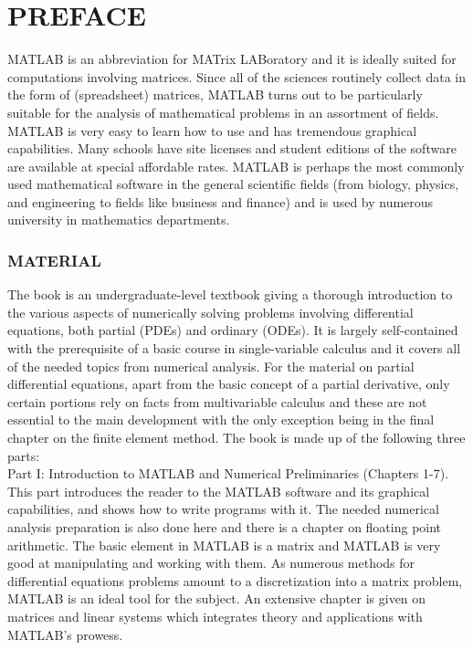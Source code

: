 \documentclass{book}
\begin{document}
\chapter*{PREFACE}
\label{cha:cha_P_1}

MATLAB\textsuperscript{\textregistered} is an abbreviation for MATrix LABoratory and it is ideally suited for computations involving matrices. Since all of the sciences routinely collect data in the form of (spreadsheet) matrices, MATLAB turns out to be particularly suitable for the analysis of mathematical problems in an assortment of fields. MATLAB is very easy to learn how to use and has tremendous graphical capabilities. Many schools have site licenses and student editions of the software are available at special affordable rates. MATLAB is perhaps the most commonly used mathematical software in the general scientific fields (from biology, physics, and engineering to fields like business and finance) and is used by numerous university in mathematics departments. 

\subsection*{MATERIAL}

\noindent The book is an undergraduate-level textbook giving a thorough introduction to the
various aspects of numerically solving problems involving differential equations,
both partial (PDEs) and ordinary (ODEs). It is largely self-contained with the
prerequisite of a basic course in single-variable calculus and it covers all of the
needed topics from numerical analysis. For the material on partial differential
equations, apart from the basic concept of a partial derivative, only certain
portions rely on facts from multivariable calculus and these are not essential to the
main development with the only exception being in the final chapter on the finite
element method. The book is made up of the following three parts:
\\

\noindent Part I: Introduction to MATLAB and Numerical Preliminaries (Chapters 1-7).
This part introduces the reader to the MATLAB software and its graphical
capabilities, and shows how to write programs with it. The needed numerical
analysis preparation is also done here and there is a chapter on floating point
arithmetic. The basic element in MATLAB is a matrix and MATLAB is very
good at manipulating and working with them. As numerous methods for
differential equations problems amount to a discretization into a matrix problem,
MATLAB is an ideal tool for the subject. An extensive chapter is given on
matrices and linear systems which integrates theory and applications with
MATLAB's prowess.
\\
\end{document}
